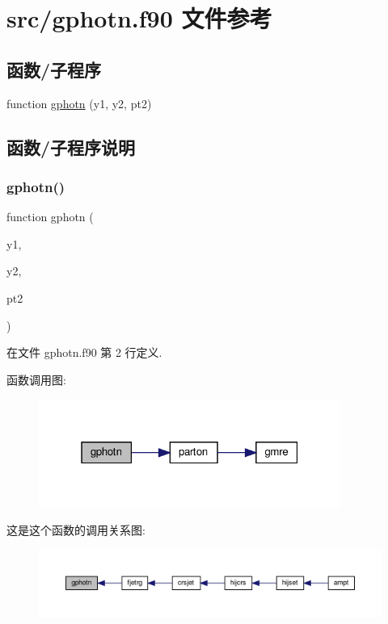 \hypertarget{gphotn_8f90}{}\section{src/gphotn.f90 文件参考}
\label{gphotn_8f90}
\subsection*{函数/子程序}
\begin{DoxyCompactItemize}
\item 
function \mbox{\hyperlink{gphotn_8f90_a6b29e8b2255574a6c36743e3e016228b}{gphotn}} (y1, y2, pt2)
\end{DoxyCompactItemize}


\subsection{函数/子程序说明}
\mbox{\label{gphotn_8f90_a6b29e8b2255574a6c36743e3e016228b}} 
\subsubsection{\texorpdfstring{gphotn()}{gphotn()}}
{\footnotesize\ttfamily function gphotn (\begin{DoxyParamCaption}\item[{}]{y1,  }\item[{}]{y2,  }\item[{}]{pt2 }\end{DoxyParamCaption})}



在文件 gphotn.\+f90 第 2 行定义.

函数调用图\+:
\nopagebreak
\begin{figure}[H]
\begin{center}
\leavevmode
\includegraphics[width=280pt]{gphotn_8f90_a6b29e8b2255574a6c36743e3e016228b_cgraph}
\end{center}
\end{figure}
这是这个函数的调用关系图\+:
\nopagebreak
\begin{figure}[H]
\begin{center}
\leavevmode
\includegraphics[width=350pt]{gphotn_8f90_a6b29e8b2255574a6c36743e3e016228b_icgraph}
\end{center}
\end{figure}

